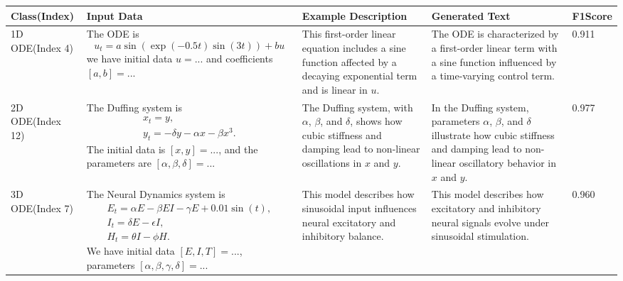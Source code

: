 \documentclass{article}
\begin{document}
\begin{table}[H]
\centering
\renewcommand{\arraystretch}{1.5} %
\begin{tabular}{|m{1.9cm}|m{5.3cm}|m{3.8cm}|m{3.8cm}|m{1cm}|}
\hline
\textbf{Class\newline(Index)} & \textbf{Input Data} & \textbf{Example Description} & \textbf{Generated Text} & \textbf{F1\newline Score} \\ \hline

1D ODE\newline(Index 4) & 
The ODE is $$u_t = a\sin(\exp(-0.5t)\sin(3t)) + bu$$ we have initial data $u =...$ and coefficients $[a,b] = ...$
 &
This first-order linear equation includes a sine function affected by a decaying exponential term and is linear in \( u \). &
The ODE is characterized by a first-order linear term with a sine function influenced by a time-varying control term. &
0.911 \\ \hline

2D ODE\newline(Index 12) &
The Duffing system is 
\begin{align*}
    x_t = y,\\
    y_t = -\delta y - \alpha x - \beta x^3.
\end{align*}
The initial data is $[x,y] = ...$, and the parameters are $[\alpha, \beta, \delta] = ...$ &
The Duffing system, with \(\alpha\), \(\beta\), and \(\delta\), shows how cubic stiffness and damping lead to non-linear oscillations in \( x \) and \( y \). &
In the Duffing system, parameters \(\alpha\), \(\beta\), and \(\delta\) illustrate how cubic stiffness and damping lead to non-linear oscillatory behavior in \( x \) and \( y \). &
0.977 \\ \hline

3D ODE\newline(Index 7) &
The Neural Dynamics system is 
\begin{align*}
    E_t = \alpha E - \beta  E  I - \gamma  E + 0.01 \sin(t),\\
    I_t = \delta  E - \epsilon  I,\\
    H_t = \theta I - \phi H.
\end{align*}
We have initial data $[E,I,T]=...$, parameters $[\alpha, \beta, \gamma, \delta] = ...$
 &
This model describes how sinusoidal input influences neural excitatory and inhibitory balance. &
This model describes how excitatory and inhibitory neural signals evolve under sinusoidal stimulation. &
0.960 \\ \hline


\end{tabular}
\end{table}
\end{document}
